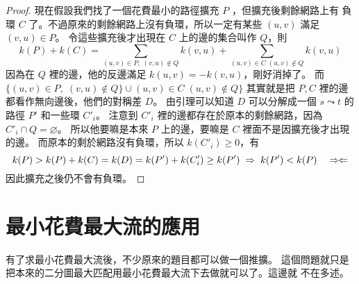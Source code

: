\documentclass[a4paper,12pt]{book}
\begin{document}
\begin{proof}
  \begin{comment}
  我們先提出一個簡單的引理。
\begin{lemma}
  定義兩個集合的對稱差 $A \oplus B = (A \setminus B) \cup (B \setminus A)$。
  也就是只出現在其中一個集合裡的元素。

  一個 $s$ 到 $t$ 的路徑 $P$ 和一個環 $C$ 的對稱差可以分解成一個從 $s$ 到 $t$
  的路徑和一些環。
\end{lemma}
\begin{proof}
  補上 $(t, s)$，那條路徑就變成一個環了。與前面的引理類似，
  因為原本環上的點的度數都是偶數，
  他們對稱差後度數仍是偶數，所以如果有 $(u_1, u_2)$ 的邊
  ，$u_2$ 也一定還能再找到一條邊出去。用類
  似剛剛引理的方法討論可以知道他們的對稱差可以分解成一些環，而
  $(t, s)$ 會屬於某個環，刪掉這條邊那個環就變成一個 $s \leadsto t$ 的
  路徑了。
\end{proof}

  現在假設我們找了一個花費最小的路徑擴充 $P$ ，但擴充後剩餘網路上有
  負環 $C$ 了。不過原來的剩餘網路上沒有負環，所以一定有某些 $(u, v)$
  滿足 $(v, u) \in P$。 現在令 $\hat{Z} = \hat{P} \oplus \hat{C}$，
  其中 $\hat{G}$ 是把 $G$ 裡的有向邊當成無向邊得出的新圖，則 $\bar{Z}$
  由引理可以分解成一個 $s \leadsto t$ 的路徑和一些環，也因此可以被
  重新定向成有向圖 $Z$，包含了一條從 $s \leadsto t$ 的路徑和一些
  有向環，注意到。
\end{comment}
  現在假設我們找了一個花費最小的路徑擴充 $P$ ，但擴充後剩餘網路上有
  負環 $C$ 了。不過原來的剩餘網路上沒有負環，所以一定有某些 $(u, v)$
  滿足 $(v, u) \in P$。 令這些擴充後才出現在 $C$ 上的邊的集合叫作 $Q$，則
  \[ k(P) + k(C) = \sum_{(u, v) \in P, \;(v, u) \notin Q} k(v, u) +
    \sum_{(u, v) \in C \; (u, v) \notin Q} k(v, u) \]
  因為在 $Q$ 裡的邊，他的反邊滿足 $k(u, v) = -k(v, u)$，剛好消掉了。
  而 $\{(u, v) \in P, \;(v, u) \notin Q\} \cup (u, v) \in C \; (u, v) \notin Q\}$
  其實就是把 $P, C$ 裡的邊都看作無向邊後，他們的對稱差 $D$。 由引理可以知道
  $D$ 可以分解成一個 $s \leadsto t$ 的路徑 $P'$ 和一些環 $C'_i$。
  注意到 $C'_i$ 裡的邊都存在於原本的剩餘網路，因為 $C'_i \cap Q = \varnothing$。
  所以他要嘛是本來 $P$ 上的邊，要嘛是 $C$ 裡面不是因擴充後才出現的邊。
  而原本的剩於網路沒有負環，所以 $k(C'_i) \geq 0$，有
  \[ k(P) > k(P) + k(C) = k(D) = k(P') + k(C'_i) \geq k(P') \;\Rightarrow\; k(P') < k(P) 
    \quad \Rightarrow\hspace*{-1pt}\Leftarrow\]
  因此擴充之後仍不會有負環。
\end{proof}

\section{最小花費最大流的應用}
有了求最小花費最大流後，不少原來的題目都可以做一個推擴。
這個問題就只是把本來的二分圖最大匹配用最小花費最大流下去做就可以了。這邊就
不在多述。
\end{document}
